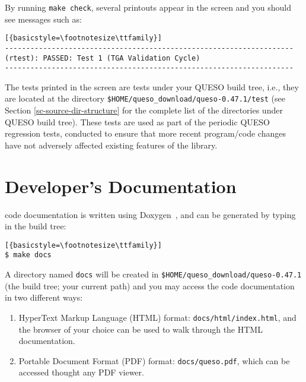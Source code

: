 
By running \texttt{make check}, several printouts appear in the screen and you should see messages such as:
\begin{lstlisting}[{basicstyle=\footnotesize\ttfamily}]
--------------------------------------------------------------------
(rtest): PASSED: Test 1 (TGA Validation Cycle)
--------------------------------------------------------------------
\end{lstlisting}

The tests printed in  the screen are tests under your QUESO build tree, i.e., they are located at the  directory \verb+$HOME/queso_download/queso-0.47.1/test+ (see Section \ref{sc-source-dir-structure} for the complete list of the directories under QUESO build tree).    
These tests are used as part of the periodic QUESO regression tests, conducted to ensure that more recent program/code changes have not adversely affected existing features of the library.



\section{\Queso{} Developer's Documentation}\label{sec:Queso_docs}



\Queso{} code documentation is written using Doxygen~\cite{Doxygen}, and can be generated by typing in the build tree:
\begin{lstlisting}[{basicstyle=\footnotesize\ttfamily}]
$ make docs
\end{lstlisting}

A directory named \verb+docs+ will be created in \verb+$HOME/queso_download/queso-0.47.1+ (the build tree; your current path) and you may access the code documentation in two different ways:
\begin{enumerate}
 \item HyperText Markup Language (HTML)  format: \verb+docs/html/index.html+, and the browser of your choice can be used to walk through the HTML documentation.

\item Portable Document Format (PDF) format: \verb+docs/queso.pdf+, which can be accessed thought any PDF viewer.
\end{enumerate}
% 

